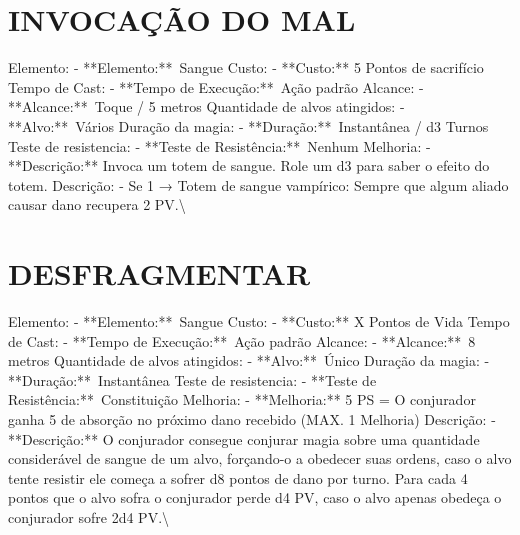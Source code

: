 \documentclass{article}%
\begin{document}
\section{INVOCAÇÃO DO MAL}%
\label{sec:INVOCAODOMAL}%
Elemento: {-} **Elemento:**~Sangue\newline%
Custo: {-} **Custo:** 5 Pontos de sacrifício\newline%
Tempo de Cast: {-} **Tempo de Execução:**~Ação padrão\newline%
Alcance: {-} **Alcance:**~Toque / 5 metros\newline%
Quantidade de alvos atingidos: {-} **Alvo:**~Vários\newline%
Duração da magia: {-} **Duração:**~Instantânea / d3 Turnos\newline%
Teste de resistencia: {-} **Teste de Resistência:**~Nenhum\newline%
Melhoria: {-} **Descrição:** Invoca um totem de sangue. Role um d3 para saber o efeito do totem.\newline%
Descrição:   {-} Se 1 → Totem de sangue vampírico: Sempre que algum aliado causar dano recupera 2 PV.\textbackslash{}

%
\section{DESFRAGMENTAR}%
\label{sec:DESFRAGMENTAR}%
Elemento: {-} **Elemento:**~Sangue\newline%
Custo: {-} **Custo:** X Pontos de Vida\newline%
Tempo de Cast: {-} **Tempo de Execução:**~Ação padrão\newline%
Alcance: {-} **Alcance:**~8 metros\newline%
Quantidade de alvos atingidos: {-} **Alvo:**~Único\newline%
Duração da magia: {-} **Duração:**~Instantânea\newline%
Teste de resistencia: {-} **Teste de Resistência:**~Constituição\newline%
Melhoria: {-} **Melhoria:** 5 PS = O conjurador ganha 5 de absorção no próximo dano recebido (MAX. 1 Melhoria)\newline%
Descrição: {-} **Descrição:** O conjurador consegue conjurar magia sobre uma quantidade considerável de sangue de um alvo, forçando{-}o a obedecer suas ordens, caso o alvo tente resistir ele começa a sofrer d8 pontos de dano por turno. Para cada 4 pontos que o alvo sofra o conjurador perde d4 PV, caso o alvo apenas obedeça o conjurador sofre 2d4 PV.\textbackslash{}
\end{document}
